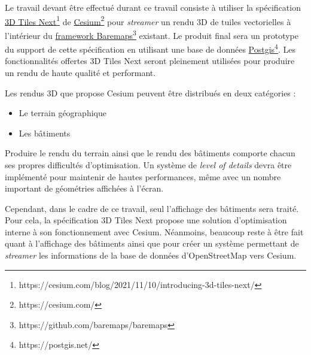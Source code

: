 Le travail devant être effectué durant ce travail consiste à utiliser la spécification \href{https://cesium.com/blog/2021/11/10/introducing-3d-tiles-next/}{3D Tiles Next}\footnote{https://cesium.com/blog/2021/11/10/introducing-3d-tiles-next/} de \href{https://cesium.com/}{Cesium}\footnote{https://cesium.com/} pour \textit{streamer} un rendu 3D de tuiles vectorielles à l'intérieur du \href{https://github.com/baremaps/baremaps}{framework Baremaps}\footnote{https://github.com/baremaps/baremaps} existant. Le produit final sera un prototype du support de cette spécification en utilisant une base de données \href{https://postgis.net/}{Postgis}\footnote{https://postgis.net/}. Les fonctionnalités offertes 3D Tiles Next seront pleinement utilisées pour produire un rendu de haute qualité et performant.

Les rendus 3D que propose Cesium peuvent être distribués en deux catégories :

\begin{itemize}
    \item[1.] Le terrain géographique
    \item[2.] Les bâtiments
\end{itemize}

Produire le rendu du terrain ainsi que le rendu des bâtiments comporte chacun ses propres difficultés d'optimisation. Un système de \textit{level of details} devra être implémenté pour maintenir de hautes performances, même avec un nombre important de géométries affichées à l'écran.

Cependant, dans le cadre de ce travail, seul l'affichage des bâtiments sera traité. Pour cela, la spécification 3D Tiles Next propose une solution d'optimisation interne à son fonctionnement avec Cesium. Néanmoins, beaucoup reste à être fait quant à l'affichage des bâtiments ainsi que pour créer un système permettant de \textit{streamer} les informations de la base de données d'OpenStreetMap vers Cesium.

